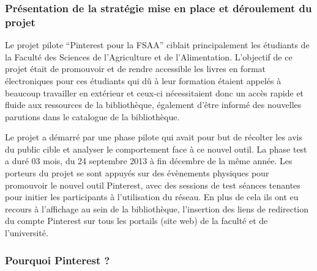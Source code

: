 \documentclass[a4paper,11pt]{article} %
\begin{document}
\subsubsection{ Présentation de la stratégie mise en place et déroulement du projet}

Le projet pilote “Pinterest pour la FSAA” ciblait principalement les étudiants de la Faculté 
des Sciences de l’Agriculture et de l’Alimentation. L’objectif de ce projet était de promouvoir 
et de rendre accessible les livres en format électroniques pour ces étudiants qui dû à leur 
formation étaient appelés à beaucoup travailler en extérieur et ceux-ci nécessitaient donc un 
accès rapide et fluide aux ressources de la bibliothèque, également d’être informé des nouvelles 
parutions dans le catalogue de la bibliothèque.

Le projet a démarré par une phase pilote qui avait pour but de récolter les avis du public 
cible et analyser le comportement face à ce nouvel outil. La phase test a duré 03 mois, du 24 
septembre 2013 à fin décembre de la même année. Les porteurs du projet se sont appuyés sur 
des évènements physiques pour promouvoir le nouvel outil Pinterest, avec des sessions de test 
séances tenantes pour initier les participants à l’utilisation du réseau. En plus de cela ils ont eu 
recours à l’affichage au sein de la bibliothèque, l’insertion des liens de redirection du compte 
Pinterest sur tous les portails (site web) de la faculté et de l’université.

\subsubsection{ Pourquoi Pinterest ?}
\end{document}
